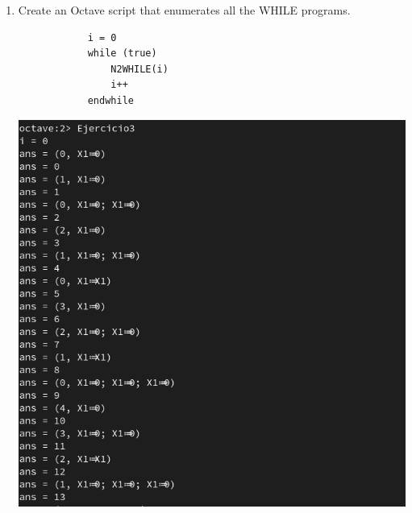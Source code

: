 \documentclass{article}
\begin{document}
\begin{enumerate}
    \item Create an Octave script that enumerates all the WHILE programs.
        \begin{verbatim}
            i = 0
            while (true)
                N2WHILE(i)
                i++
            endwhile
        \end{verbatim}
        \includegraphics[scale=0.35]{Ej3.png}

    \end{enumerate}
\end{document}
